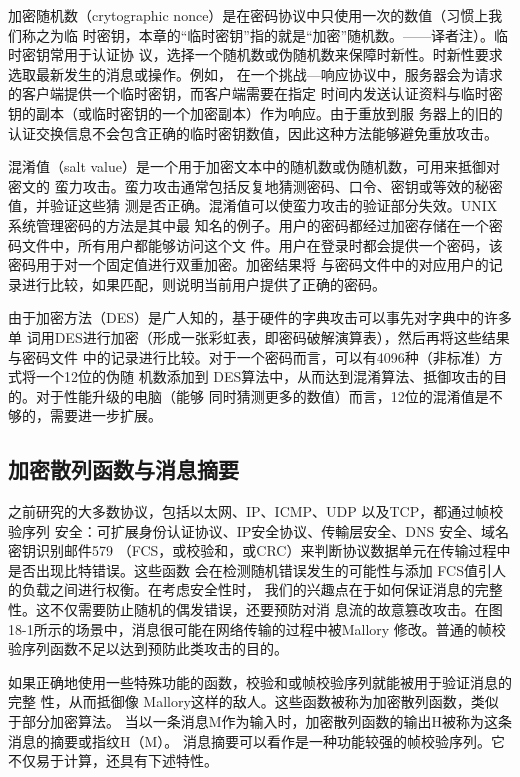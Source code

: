 加密随机数（crytographic nonce）是在密码协议中只使用一次的数值（习惯上我们称之为临
时密钥，本章的“临时密钥”指的就是“加密”随机数。——译者注）。临时密钥常用于认证协
议，选择一个随机数或伪随机数来保障时新性。时新性要求选取最新发生的消息或操作。例如，
在一个挑战—响应协议中，服务器会为请求的客户端提供一个临时密钥，而客户端需要在指定
时间内发送认证资料与临时密钥的副本（或临时密钥的一个加密副本）作为响应。由于重放到服
务器上的旧的认证交换信息不会包含正确的临时密钥数值，因此这种方法能够避免重放攻击。

混淆值（salt value）是一个用于加密文本中的随机数或伪随机数，可用来抵御对密文的
蛮力攻击。蛮力攻击通常包括反复地猜测密码、口令、密钥或等效的秘密值，并验证这些猜
测是否正确。混淆值可以使蛮力攻击的验证部分失效。UNIX 系统管理密码的方法是其中最
知名的例子。用户的密码都经过加密存储在一个密码文件中，所有用户都能够访问这个文
件。用户在登录时都会提供一个密码，该密码用于对一个固定值进行双重加密。加密结果将
与密码文件中的对应用户的记录进行比较，如果匹配，则说明当前用户提供了正确的密码。

由于加密方法（DES）是广人知的，基于硬件的字典攻击可以事先对字典中的许多单
词用DES进行加密（形成一张彩虹表，即密码破解演算表），然后再将这些结果与密码文件
中的记录进行比较。对于一个密码而言，可以有4096种（非标准）方式将一个12位的伪随
机数添加到 DES算法中，从而达到混淆算法、抵御攻击的目的。对于性能升级的电脑（能够
同时猜测更多的数值）而言，12位的混淆值是不够的，需要进一步扩展。

\subsection{加密散列函数与消息摘要}

之前研究的大多数协议，包括以太网、IP、ICMP、UDP 以及TCP，都通过帧校验序列
安全：可扩展身份认证协议、IP安全协议、传輸层安全、DNS 安全、域名密钥识别邮件579
（FCS，或校验和，或CRC）来判断协议数据单元在传输过程中是否出现比特错误。这些函数
会在检测随机错误发生的可能性与添加 FCS值引人的负载之间进行权衡。在考虑安全性时，
我们的兴趣点在于如何保证消息的完整性。这不仅需要防止随机的偶发错误，还要预防对消
息流的故意篡改攻击。在图18-1所示的场景中，消息很可能在网络传输的过程中被Mallory
修改。普通的帧校验序列函数不足以达到预防此类攻击的目的。

如果正确地使用一些特殊功能的函数，校验和或帧校验序列就能被用于验证消息的完整
性，从而抵御像 Mallory这样的敌人。这些函数被称为加密散列函数，类似于部分加密算法。
当以一条消息M作为输入时，加密散列函数的输出H被称为这条消息的摘要或指纹H（M）。
消息摘要可以看作是一种功能较强的帧校验序列。它不仅易于计算，还具有下述特性。

